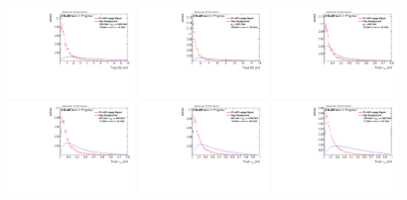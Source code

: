 \begin{figure}[H]
\includegraphics[width=0.3\textwidth]{sascha_input/Appendix/Distributions/w/distributions/beta2/h_normal_tj_D2_2_bin5.pdf} \hspace{1mm}
\includegraphics[width=0.3\textwidth]{sascha_input/Appendix/Distributions/w/distributions/beta2/h_normal_tj_D2_2_bin6.pdf}
\bigskip
\includegraphics[width=0.3\textwidth]{sascha_input/Appendix/Distributions/w/distributions/beta2/h_normal_tj_nSub21_2_bin1.pdf} \hspace{1mm}
\includegraphics[width=0.3\textwidth]{sascha_input/Appendix/Distributions/w/distributions/beta2/h_normal_tj_nSub21_2_bin2.pdf} \hspace{1mm}
\includegraphics[width=0.3\textwidth]{sascha_input/Appendix/Distributions/w/distributions/beta2/h_normal_tj_nSub21_2_bin3.pdf} 
\bigskip
\includegraphics[width=0.3\textwidth]{sascha_input/Appendix/Distributions/w/distributions/beta2/h_normal_tj_nSub21_2_bin4.pdf} \hspace{6mm}

\end{figure}
